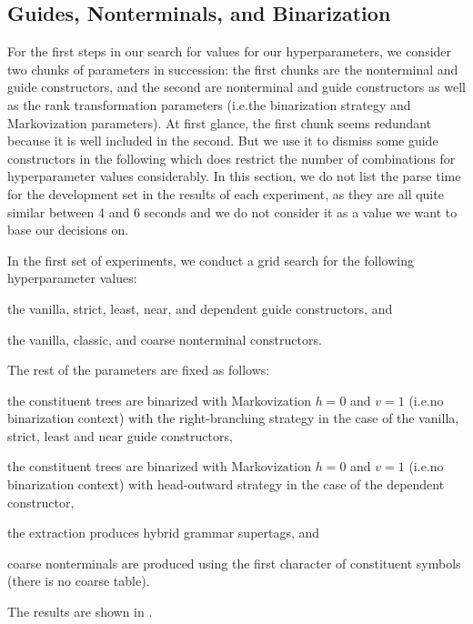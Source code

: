 \documentclass[../../document.tex]{subfiles}
\begin{document}
    \subsection{Guides, Nonterminals, and Binarization}\label{sec:gridsearch:nts-guides}
    For the first steps in our search for values for our hyperparameters, we consider two chunks of parameters in succession: the first chunks are the nonterminal and guide constructors, and the second are nonterminal and guide constructors as well as the rank transformation parameters (i.e.\@ the binarization strategy and Markovization parameters).
    At first glance, the first chunk seems redundant because it is well included in the second.
    But we use it to dismiss some guide constructors in the following which does restrict the number of combinations for hyperparameter values considerably.
    In this section, we do not list the parse time for the development set in the results of each experiment, as they are all quite similar between 4 and 6 seconds and we do not consider it as a value we want to base our decisions on.

    In the first set of experiments, we conduct a grid search for the following hyperparameter values:
    \begin{compactitem}
        \item the vanilla, strict, least, near, and dependent guide constructors, and
        \item the vanilla, classic, and coarse nonterminal constructors.
    \end{compactitem}
    The rest of the parameters are fixed as follows:
    \begin{compactitem}
        \item the constituent trees are binarized with Markovization \(h=0\) and \(v=1\) (i.e.\@ no binarization context) with the right-branching strategy in the case of the vanilla, strict, least and near guide constructors,
        \item the constituent trees are binarized with Markovization \(h=0\) and \(v=1\) (i.e.\@ no binarization context) with head-outward strategy in the case of the dependent constructor,
        \item the extraction produces hybrid grammar supertags, and
        \item coarse nonterminals are produced using the first character of constituent symbols (there is no coarse table).
    \end{compactitem}
    The results are shown in .
    
\end{document}
